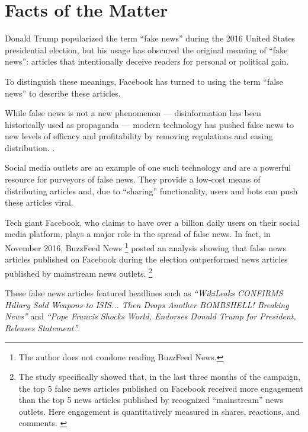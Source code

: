 

\section{Facts of the Matter}

\par Donald Trump popularized the term ``fake news'' during the 2016 United States presidential election, \cite{tc_what_is_fake_news} but his usage has obscured the original meaning of ``fake news'': articles that intentionally deceive readers for personal or political gain. \cite{tc_what_is_fake_news, npr_fake_news}

\par To distinguish these meanings, Facebook has turned to using the term ``false news'' to describe these articles. \cite{fb_spot_fake_news}

\par While false news is not a new phenomenon --- disinformation has been historically used as propaganda \cite{bbc_fn_propaganda} --- modern technology has pushed false news to new levels of efficacy and profitability by removing regulations and easing distribution. \cite{telegraph_fake_news}.

\par Social media outlets are an example of one such technology and are a powerful resource for purveyors of false news. They provide a low-cost means of distributing articles and, due to ``sharing'' functionality, users and bots can push these articles viral. \cite{cbs_fake_news}

\par Tech giant Facebook, who claims to have over a billion daily users on their social media platform, plays a major role in the spread of false news. \cite{cbs_fake_news} In fact, in November 2016, BuzzFeed News \footnote{The author does not condone reading BuzzFeed News.} posted an analysis showing that false news articles published on Facebook during the election outperformed news articles published by mainstream news outlets. \footnote{The study specifically showed that, in the last three months of the campaign, the top 5 false news articles published on Facebook received more engagement than the top 5 news articles published by recognized ``mainstream'' news outlets. Here engagement is quantitatively measured in shares, reactions, and comments. \cite{buzzfeed_news_analysis}} \cite{buzzfeed_news_analysis}

\par These false news articles featured headlines such as
\emph{``WikiLeaks CONFIRMS Hillary Sold Weapons to ISIS... Then Drops Another BOMBSHELL! Breaking News''} and
\emph{``Pope Francis Shocks World, Endorses Donald Trump for President, Releases Statement''}. \cite{buzzfeed_news_analysis}

